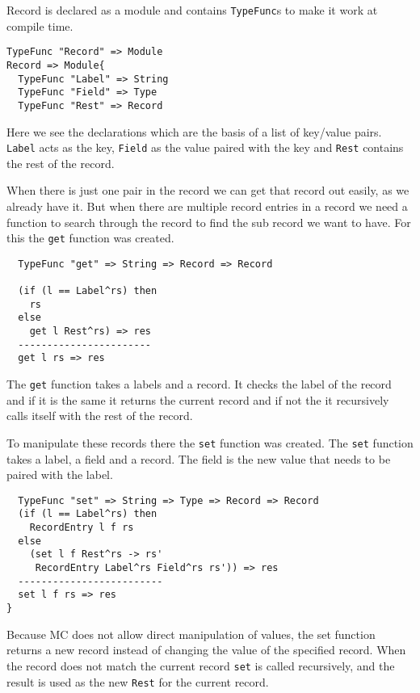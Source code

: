 Record is declared as a module and contains \texttt{TypeFunc}s to make it work at compile time.

\begin{lstlisting}
TypeFunc "Record" => Module
Record => Module{
  TypeFunc "Label" => String
  TypeFunc "Field" => Type
  TypeFunc "Rest" => Record
\end{lstlisting}

Here we see the declarations which are the basis of a list of key/value pairs.
\texttt{Label} acts as the key, \texttt{Field} as the value paired with the key and \texttt{Rest} contains the rest of the record.

When there is just one pair in the record we can get that record out easily, as we already have it.
But when there are multiple record entries in a record we need a function to search through the record to find the sub record we want to have.
For this the \texttt{get} function was created.

\begin{lstlisting}
  TypeFunc "get" => String => Record => Record

  (if (l == Label^rs) then
    rs
  else
    get l Rest^rs) => res
  -----------------------
  get l rs => res
\end{lstlisting}

The \texttt{get} function takes a labels and a record.
It checks the label of the record and if it is the same it returns the current record and if not the it recursively calls itself with the rest of the record.

To manipulate these records there the \texttt{set} function was created.
The \texttt{set} function takes a label, a field and a record.
The field is the new value that needs to be paired with the label.

\begin{lstlisting}
  TypeFunc "set" => String => Type => Record => Record
  (if (l == Label^rs) then
    RecordEntry l f rs
  else
    (set l f Rest^rs -> rs'
     RecordEntry Label^rs Field^rs rs')) => res
  -------------------------
  set l f rs => res
}
\end{lstlisting}

Because MC does not allow direct manipulation of values, the set function returns a new record instead of changing the value of the specified record.
When the record does not match the current record \texttt{set} is called recursively, and the result is used as the new \texttt{Rest} for the current record.

